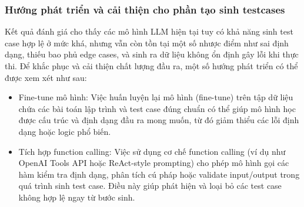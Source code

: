 \subsubsection{Hướng phát triển và cải thiện cho phần tạo sinh testcases}

Kết quả đánh giá cho thấy các mô hình LLM hiện tại tuy có khả năng sinh test case hợp lệ ở mức khá, nhưng vẫn còn tồn tại một số nhược điểm như sai định dạng, thiếu bao phủ edge cases, và sinh ra dữ liệu không ổn định gây lỗi khi thực thi. Để khắc phục và cải thiện chất lượng đầu ra, một số hướng phát triển có thể được xem xét như sau:

\begin{itemize}
    \item Fine-tune mô hình: Việc huấn luyện lại mô hình (fine-tune) trên tập dữ liệu chứa các bài toán lập trình và test case đúng chuẩn có thể giúp mô hình học được cấu trúc và định dạng đầu ra mong muốn, từ đó giảm thiểu các lỗi định dạng hoặc logic phổ biến.

    \item Tích hợp function calling: Việc sử dụng cơ chế function calling (ví dụ như OpenAI Tools API hoặc ReAct-style prompting) cho phép mô hình gọi các hàm kiểm tra định dạng, phân tích cú pháp hoặc validate input/output trong quá trình sinh test case. Điều này giúp phát hiện và loại bỏ các test case không hợp lệ ngay từ bước sinh.
\end{itemize}
